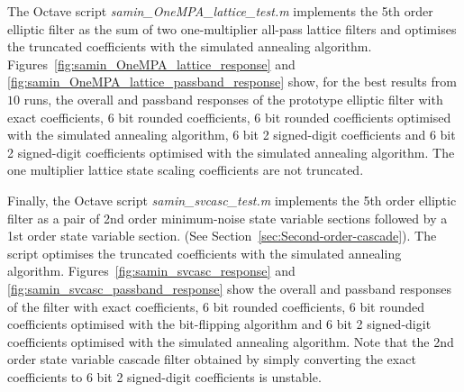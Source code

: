 \documentclass[a4paper,twoside,10pt,english]{report}
\begin{document}
The Octave script \emph{samin\_OneMPA\_lattice\_test.m} implements the 5th 
order elliptic filter as the sum of two one-multiplier all-pass lattice filters
and optimises the truncated coefficients with the simulated annealing algorithm.
Figures~\ref{fig:samin_OneMPA_lattice_response} and
\ref{fig:samin_OneMPA_lattice_passband_response} show, for the best results from
$10$ runs, the overall and passband responses of the prototype elliptic filter 
with exact coefficients, 6 bit rounded coefficients, 6 bit rounded coefficients 
optimised with the simulated annealing algorithm, 6 bit 2 signed-digit 
coefficients and 6 bit 2 signed-digit coefficients optimised with the simulated
annealing algorithm. The one multiplier lattice state scaling coefficients are 
not truncated. 

Finally, the Octave script \emph{samin\_svcasc\_test.m} implements the 5th
order elliptic filter as a pair of 2nd order minimum-noise state variable 
sections followed by a 1st order state variable section. (See 
Section~\ref{sec:Second-order-cascade}). The script optimises the truncated 
coefficients with the simulated annealing algorithm. 
Figures~\ref{fig:samin_svcasc_response} and 
\ref{fig:samin_svcasc_passband_response} show the overall and passband
responses of the filter with exact coefficients, 6 bit rounded
coefficients, 6 bit rounded coefficients optimised with the bit-flipping 
algorithm and 6 bit 2 signed-digit coefficients optimised with the simulated
annealing algorithm. Note that the 2nd order
state variable cascade filter obtained by simply converting the exact 
coefficients to 6 bit 2 signed-digit coefficients is unstable.
\end{document}

